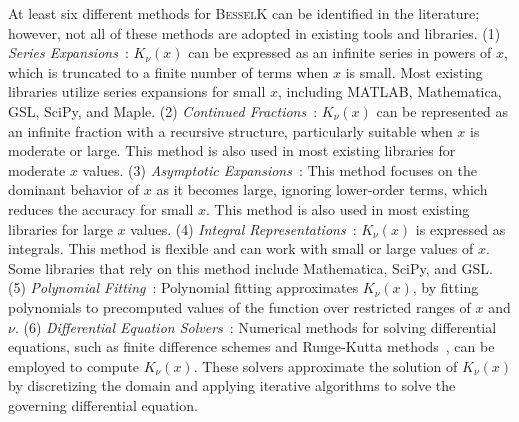At least six different methods for \textsc{BesselK} can be identified in the literature; however, not all of these methods are adopted in existing tools and libraries. (1) \textit{Series Expansions}~\cite{bbtemme}: \( K_\nu(x) \) can be expressed as an infinite series in powers of \( x \), which is truncated to a finite number of terms when \( x \) is small. Most existing libraries utilize series expansions for small \( x \), including MATLAB, Mathematica, GSL, SciPy, and Maple. (2) \textit{Continued Fractions}~\cite{amos1974computation}: \( K_\nu(x) \) can be represented as an infinite fraction with a recursive structure, particularly suitable when \( x \) is moderate or large. This method is also used in most existing libraries for moderate $x$ values. (3) \textit{Asymptotic Expansions}~\cite{olver2009bessel}: This method focuses on the dominant behavior of \( x \) as it becomes large, ignoring lower-order terms, which reduces the accuracy for small \( x \). This method is also used in most existing libraries for large \( x \) values.
(4) \textit{Integral Representations}~\cite{bbtakekawa,luke2014integrals}: \( K_\nu(x) \) is expressed as integrals. This method is flexible and can work with small or large values of $x$. Some libraries that rely on this method include Mathematica, SciPy, and GSL. (5) \textit{Polynomial Fitting}~\cite{grosswald1978bessel}: Polynomial fitting approximates \( K_\nu(x) \), by fitting polynomials to precomputed values of the function over restricted ranges of \( x \) and \( \nu \). (6) \textit{Differential Equation Solvers}~\cite{carley2013numerical}: Numerical methods for solving differential equations, such as finite difference schemes and Runge-Kutta methods~\cite{butcher2007runge}, can be employed to compute \( K_\nu(x) \). These solvers approximate the solution of \( K_\nu(x) \) by discretizing the domain and applying iterative algorithms to solve the governing differential equation.



